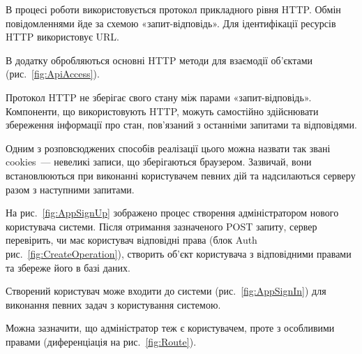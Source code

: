 В процесі роботи використовується протокол прикладного рівня HTTP. Обмін повідомленнями йде за схемою «запит-відповідь». Для ідентифікації ресурсів HTTP використовує URL. 

В додатку обробляються основні  HTTP методи для взаємодії об’єктами (рис.~\ref{fig:ApiAccess}). 

Протокол HTTP не зберігає свого стану між парами «запит-відповідь». Компоненти, що використовують HTTP, можуть самостійно здійснювати збереження інформації про стан, пов'язаний з останніми запитами та відповідями. 

Одним з розповсюджених способів реалізації цього можна назвати так звані cookies~--- невеликі записи, що зберігаються браузером. Зазвичай, вони встановлюються при виконанні користувачем певних дій та надсилаються серверу разом з наступними запитами. 

На рис.~\ref{fig:AppSignUp} зображено процес створення адміністратором нового користувача системи. Після отримання зазначеного POST запиту, сервер перевірить, чи має користувач відповідні права (блок Auth рис.~\ref{fig:CreateOperation}), створить об’єкт користувача з відповідними правами та збереже його в базі даних.


Створений користувач може входити до системи (рис.~\ref{fig:AppSignIn}) для виконання певних задач з користування системою.


Можна зазначити, що адміністратор теж є користувачем, проте з особливими правами (диференціація на рис.~\ref{fig:Route}).

